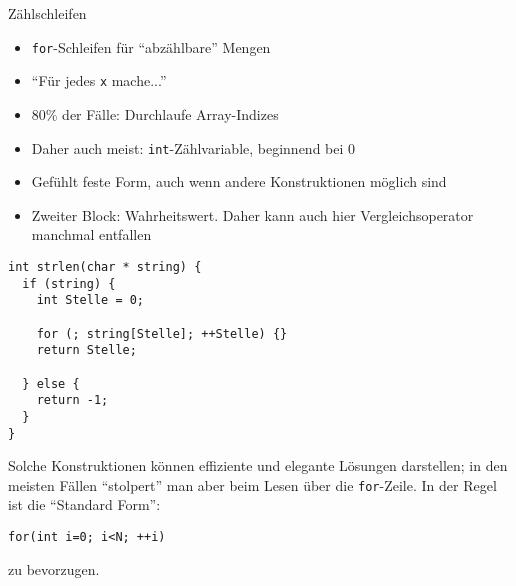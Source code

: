 
\begin{frame}{Zählschleifen}
%
\begin{itemize}
\item \texttt{for}-Schleifen für \enquote{abzählbare} Mengen
\item \enquote{Für jedes \texttt{x} mache...}
\item 80\% der Fälle: Durchlaufe Array-Indizes
\item Daher auch meist: \texttt{int}-Zählvariable, beginnend bei 0
\item Gefühlt feste Form, auch wenn andere Konstruktionen möglich sind
\item Zweiter Block: Wahrheitswert. Daher kann auch hier Vergleichsoperator manchmal entfallen
\end{itemize}
%
\end{frame}


\begin{frame}[fragile]
%
%
\begin{codebox}[Beispiel: \texttt{strlen} mit \texttt{for}, equal height group=B]
\begin{verbatim}
int strlen(char * string) {
  if (string) {
    int Stelle = 0;
    
    for (; string[Stelle]; ++Stelle) {}
    return Stelle;
    
  } else {
    return -1;
  }
}
\end{verbatim}
\end{codebox}
%
\begin{hintbox}[Tipp, equal height group=B]
\small
Solche Konstruktionen können effiziente und elegante Lösungen darstellen; in den meisten Fällen \enquote{stolpert} man aber beim Lesen über die \texttt{for}-Zeile. In der Regel ist die \enquote{Standard Form}:
\begin{center}
\texttt{for(int i=0; i<N; ++i)}
\end{center}
zu bevorzugen.
\end{hintbox}
%
%
\end{frame}


